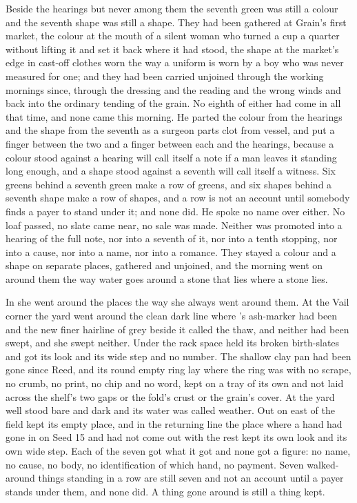 Beside the hearings but never among them the seventh green was still a colour and the seventh shape was still a shape. They had been gathered at Grain's first market, the colour at the mouth of a silent woman who turned a cup a quarter without lifting it and set it back where it had stood, the shape at the market's edge in cast-off clothes worn the way a uniform is worn by a boy who was never measured for one; and they had been carried unjoined through the working mornings since, through the dressing and the reading and the wrong winds and back into the ordinary tending of the grain. No eighth of either had come in all that time, and none came this morning. He parted the colour from the hearings and the shape from the seventh as a surgeon parts clot from vessel, and put a finger between the two and a finger between each and the hearings, because a colour stood against a hearing will call itself a note if a man leaves it standing long enough, and a shape stood against a seventh will call itself a witness. Six greens behind a seventh green make a row of greens, and six shapes behind a seventh shape make a row of shapes, and a row is not an account until somebody finds a payer to stand under it; and none did. He spoke no name over either. No loaf passed, no slate came near, no sale was made. Neither was promoted into a hearing of the full note, nor into a seventh of it, nor into a tenth stopping, nor into a cause, nor into a name, nor into a romance. They stayed a colour and a shape on separate places, gathered and unjoined, and the morning went on around them the way water goes around a stone that lies where a stone lies.

\scenebreak

In  she went around the places the way she always went around them. At the Vail corner the yard went around the clean dark line where 's ash-marker had been and the new finer hairline of grey beside it called the thaw, and neither had been swept, and she swept neither. Under  the rack space held its broken birth-slates and got its look and its wide step and no number. The shallow clay pan had been gone since Reed, and its round empty ring lay where the ring was with no scrape, no crumb, no print, no chip and no word, kept on a tray of its own and not laid across the shelf's two gaps or the fold's crust or the grain's cover. At the yard well  stood bare and dark and its water was called weather. Out on  east of  the field kept its empty place, and in the returning line the place where a hand had gone in on Seed 15 and had not come out with the rest kept its own look and its own wide step. Each of the seven got what it got and none got a figure: no name, no cause, no body, no identification of which hand, no payment. Seven walked-around things standing in a row are still seven and not an account until a payer stands under them, and none did. A thing gone around is still a thing kept.

